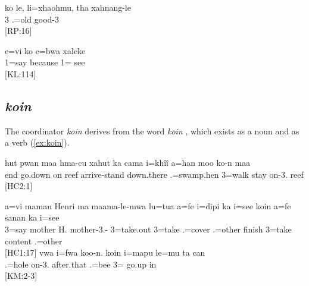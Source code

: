 \ea\label{ex:ko_but2}\gll ko le, li=xhaohmu, tha xahnang-le\\
  3 .=old  good-3\\
\glt {} {[RP:16]}
\z

\ea\label{ex:ko_reason}\gll e=vi ko e=bwa xaleke\\
 1=say because 1= see\\
\glt {} {[KL:114]}
\z


\subsection{\textit{koin} }
\label{ssec:koin}
The coordinator \textit{koin}  derives from the word \textit{koin} , which exists as a noun and as a verb (\ref{ex:koin}). 

\ea  \label{ex:koin} hut pwan maa hma-cu xahut ka cama i=khîî a=han moo ko-n maa\\
 end go.down on reef arrive-stand down.there   .=swamp.hen 3=walk stay on-3. reef\\
\glt {} {[HC2:1]}
\z

\ea\gll a=vi maman Henri ma maama-le-mwa lu=tua a=fe i=dipi ka i=see {koin} a=fe sanan ka i=see \\
 3=say mother H.  mother-3.- 3=take.out 3=take .=cover  .=other finish 3=take content  .=other \\
\glt  {} {[HC1:17]} 
\z
%
%
%
%
%
\ea
\gll vwa i=fwa koo-n. koin i=mapu le=mu ta can \\
  .=hole on-3. after.that .=bee 3= go.up in\\
\glt {} {[KM:2-3]}
\z

